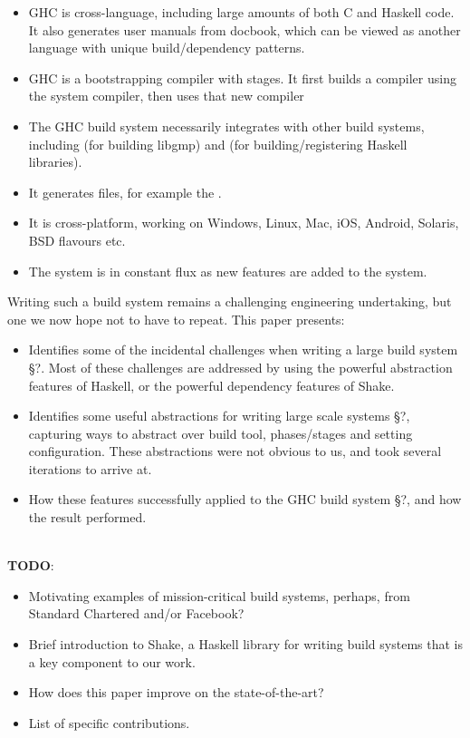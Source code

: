 \begin{itemize}
\item GHC is cross-language, including large amounts of both C and Haskell code. It also generates user manuals from docbook, which can be viewed as another language with unique build/dependency patterns.
\item GHC is a bootstrapping compiler with stages. It first builds a compiler using the system compiler, then uses that new compiler 
\item The GHC build system necessarily integrates with other build systems, including \make (for building libgmp) and \cabal (for building/registering Haskell libraries).
\item It generates files, for example the .
\item It is cross-platform, working on Windows, Linux, Mac, iOS, Android, Solaris, BSD flavours etc.
\item The system is in constant flux as new features are added to the system.
\end{itemize}

Writing such a build system remains a challenging engineering undertaking, but one we now hope not to have to repeat. 
This paper presents:

\begin{itemize}
\item Identifies some of the incidental challenges when writing a large build system \S?. Most of these challenges are addressed by using the powerful abstraction features of Haskell, or the powerful dependency features of Shake.
\item Identifies some useful abstractions for writing large scale systems \S?, capturing ways to abstract over build tool, phases/stages and setting configuration. These abstractions were not obvious to us, and took several iterations to arrive at.
\item How these features successfully applied to the GHC build system \S?, and how the result performed.
\end{itemize}


~\\
\textbf{TODO}:
\begin{itemize}
  \item Motivating examples of mission-critical build systems, perhaps, from
  Standard Chartered and/or Facebook?
  \item Brief introduction to Shake, a Haskell library for writing build systems
  that is a key component to our work.
  \item How does this paper improve on the state-of-the-art?
  \item List of specific contributions.
\end{itemize}
